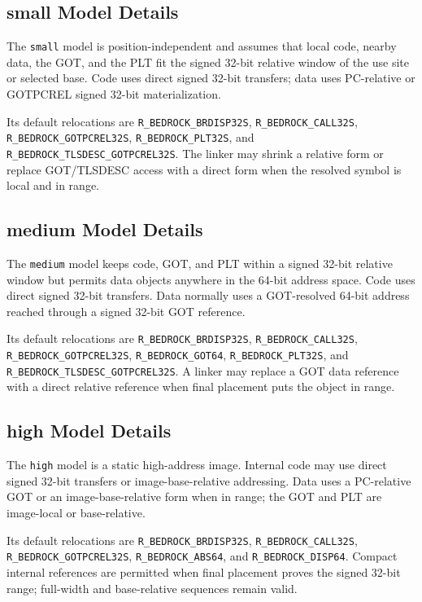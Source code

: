 \documentclass[10pt,twoside]{article}
\begin{document}
\subsection{small Model Details}
The \texttt{small} model is position-independent and assumes that local code,
nearby data, the GOT, and the PLT fit the signed 32-bit relative window of the
use site or selected base. Code uses direct signed 32-bit transfers; data uses
PC-relative or GOTPCREL signed 32-bit materialization.

Its default relocations are \texttt{R\_BEDROCK\_BRDISP32S},
\texttt{R\_BEDROCK\_CALL32S}, \texttt{R\_BEDROCK\_GOTPCREL32S},
\texttt{R\_BEDROCK\_PLT32S}, and
\texttt{R\_BEDROCK\_TLSDESC\_GOTPCREL32S}. The linker may shrink a relative
form or replace GOT/TLSDESC access with a direct form when the resolved symbol
is local and in range.
\subsection{medium Model Details}
The \texttt{medium} model keeps code, GOT, and PLT within a signed 32-bit
relative window but permits data objects anywhere in the 64-bit address space.
Code uses direct signed 32-bit transfers. Data normally uses a GOT-resolved
64-bit address reached through a signed 32-bit GOT reference.

Its default relocations are \texttt{R\_BEDROCK\_BRDISP32S},
\texttt{R\_BEDROCK\_CALL32S}, \texttt{R\_BEDROCK\_GOTPCREL32S},
\texttt{R\_BEDROCK\_GOT64}, \texttt{R\_BEDROCK\_PLT32S}, and
\texttt{R\_BEDROCK\_TLSDESC\_GOTPCREL32S}. A linker may replace a GOT data
reference with a direct relative reference when final placement puts the
object in range.

\subsection{high Model Details}
The \texttt{high} model is a static high-address image. Internal code may use
direct signed 32-bit transfers or image-base-relative addressing. Data uses a
PC-relative GOT or an image-base-relative form when in range; the GOT and PLT
are image-local or base-relative.

Its default relocations are \texttt{R\_BEDROCK\_BRDISP32S},
\texttt{R\_BEDROCK\_CALL32S}, \texttt{R\_BEDROCK\_GOTPCREL32S},
\texttt{R\_BEDROCK\_ABS64}, and \texttt{R\_BEDROCK\_DISP64}. Compact internal
references are permitted when final placement proves the signed 32-bit range;
full-width and base-relative sequences remain valid.
\end{document}
